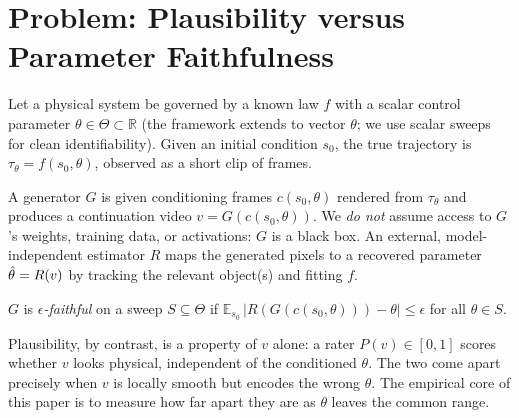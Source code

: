\documentclass[10pt,twocolumn,letterpaper]{article}
\begin{document}
\section{Problem: Plausibility versus Parameter Faithfulness}
\label{sec:problem}

Let a physical system be governed by a known law $f$ with a scalar control
parameter $\theta \in \Theta \subset \mathbb{R}$ (the framework extends to
vector $\theta$; we use scalar sweeps for clean identifiability). Given an
initial condition $s_0$, the true trajectory is
$\tau_\theta = f(s_0,\theta)$, observed as a short clip of frames.

A generator $G$ is given conditioning frames $c(s_0,\theta)$ rendered from
$\tau_\theta$ and produces a continuation video $v = G(c(s_0,\theta))$. We
\emph{do not} assume access to $G$'s weights, training data, or activations:
$G$ is a black box. An external, model-independent estimator $R$ maps the
generated pixels to a recovered parameter $\hat{\theta} = R(v)$ by tracking the
relevant object(s) and fitting $f$.

\begin{definition}
$G$ is \emph{$\epsilon$-faithful} on a sweep $S\subseteq\Theta$ if
$\mathbb{E}_{s_0}\,|R(G(c(s_0,\theta)))-\theta| \le \epsilon$ for all
$\theta\in S$.
\end{definition}

Plausibility, by contrast, is a property of $v$ alone: a rater $P(v)\in[0,1]$
scores whether $v$ looks physical, independent of the conditioned $\theta$. The
two come apart precisely when $v$ is locally smooth but encodes the wrong
$\theta$. The empirical core of this paper is to measure how far apart they are
as $\theta$ leaves the common range.
\end{document}
